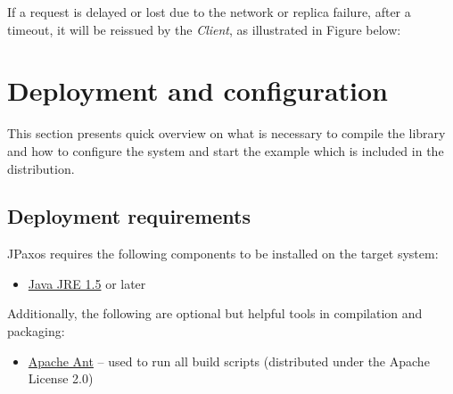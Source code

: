 If a request is delayed or lost due to the network or replica failure,
after a timeout, it will be reissued by the \emph{Client}, as illustrated in
Figure below:
\begin{quote}
\begin{figure}[htbp]
\centering

\end{figure}
\end{quote}


\section{Deployment and configuration}
\label{config:deployment-and-configuration}\label{config::doc}
This section presents quick overview on what is necessary to compile the
library and how to configure the system and start the example which is included
in the distribution.


\subsection{Deployment requirements}
\label{config:deployment-requirements}
JPaxos requires the following components to be installed on the target system:
\begin{itemize}
\item {} 
\href{http://www.java.com/}{Java JRE 1.5} or later

\end{itemize}

Additionally, the following are optional but helpful tools in compilation and
packaging:
\begin{itemize}
\item {} 
\href{http://ant.apache.org/}{Apache Ant} -- used to run all build scripts (distributed under the Apache
License 2.0)

\end{itemize}


